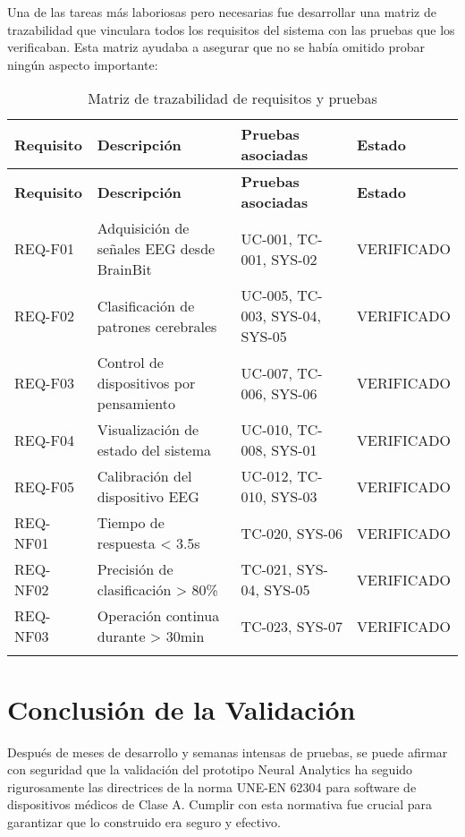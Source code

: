 Una de las tareas más laboriosas pero necesarias fue desarrollar una matriz de trazabilidad que vinculara todos los requisitos del sistema con las pruebas que los verificaban. Esta matriz ayudaba a asegurar que no se había omitido probar ningún aspecto importante:


\begin{center}
\small
\begin{longtable}{|p{2.5cm}|p{5.5cm}|p{3.5cm}|p{2.5cm}|}
    \hline
    \textbf{Requisito} & \textbf{Descripción} & \textbf{Pruebas asociadas} & \textbf{Estado} \\
    \hline
    \endfirsthead
    \hline
    \textbf{Requisito} & \textbf{Descripción} & \textbf{Pruebas asociadas} & \textbf{Estado} \\
    \hline
    \endhead
    REQ-F01 & Adquisición de señales EEG desde BrainBit & UC-001, TC-001, SYS-02 & VERIFICADO \\
    \hline
    REQ-F02 & Clasificación de patrones cerebrales & UC-005, TC-003, SYS-04, SYS-05 & VERIFICADO \\
    \hline
    REQ-F03 & Control de dispositivos por pensamiento & UC-007, TC-006, SYS-06 & VERIFICADO \\
    \hline
    REQ-F04 & Visualización de estado del sistema & UC-010, TC-008, SYS-01 & VERIFICADO \\
    \hline
    REQ-F05 & Calibración del dispositivo EEG & UC-012, TC-010, SYS-03 & VERIFICADO \\
    \hline
    REQ-NF01 & Tiempo de respuesta < 3.5s & TC-020, SYS-06 & VERIFICADO \\
    \hline
    REQ-NF02 & Precisión de clasificación > 80\% & TC-021, SYS-04, SYS-05 & VERIFICADO \\
    \hline
    REQ-NF03 & Operación continua durante > 30min & TC-023, SYS-07 & VERIFICADO \\
    \hline
    \caption{Matriz de trazabilidad de requisitos y pruebas}\label{fig:traceability}
\end{longtable}
\end{center}

\newpage
\section{Conclusión de la Validación}

Después de meses de desarrollo y semanas intensas de pruebas, se puede afirmar con seguridad que la validación del prototipo Neural Analytics ha seguido rigurosamente las directrices de la norma UNE-EN 62304 para software de dispositivos médicos de Clase A. Cumplir con esta normativa fue crucial para garantizar que lo construido era seguro y efectivo.

